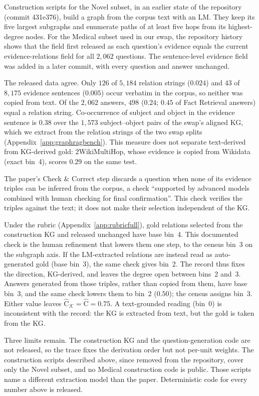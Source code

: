 \documentclass[11pt]{article}
\newcommand{\Chat}{\widehat{\mathrm{C}}}
\newcommand{\kg}{\mathcal{K}}
\begin{document}
Construction scripts for the Novel subset, in an earlier state of the repository (commit 431e376), build a graph from the corpus text with an LM. They keep its five largest subgraphs and enumerate paths of at least five hops from its highest-degree nodes. For the Medical subset used in our swap, the repository history shows that the field first released as each question's evidence equals the current evidence-relations field for all $2{,}062$ questions. The sentence-level evidence field was added in a later commit, with every question and answer unchanged.

The released data agree. Only $126$ of $5{,}184$ relation strings ($0.024$) and $43$ of $8{,}175$ evidence sentences ($0.005$) occur verbatim in the corpus, so neither was copied from text. Of the $2{,}062$ answers, $498$ ($0.24$; $0.45$ of Fact Retrieval answers) equal a relation string. Co-occurrence of subject and object in the evidence sentence is $0.38$ over the $1{,}573$ subject--object pairs of the swap's aligned KG, which we extract from the relation strings of the two swap splits (Appendix~\ref{app:graphragbench}). This measure does not separate text-derived from KG-derived gold: 2WikiMultiHop, whose evidence is copied from Wikidata (exact bin~4), scores $0.29$ on the same test.

The paper's Check \& Correct step discards a question when none of its evidence triples can be inferred from the corpus, a check ``supported by advanced models combined with human checking for final confirmation''. This check verifies the triples against the text; it does not make their selection independent of the KG.

Under the rubric (Appendix~\ref{app:rubricfull}), gold relations selected from the construction KG and released unchanged have base bin~4. This documented check is the human refinement that lowers them one step, to the census bin~3 on the subgraph axis. If the LM-extracted relations are instead read as auto-generated gold (base bin~3), the same check gives bin~2. The record thus fixes the direction, KG-derived, and leaves the degree open between bins~2 and~3. Answers generated from those triples, rather than copied from them, have base bin~3, and the same check lowers them to bin~2 ($0.50$); the census assigns bin~3. Either value leaves $\Chat_{\kg}=\Chat=0.75$. A text-grounded reading (bin~0) is inconsistent with the record: the KG is extracted from text, but the gold is taken from the KG.

Three limits remain. The construction KG and the question-generation code are not released, so the trace fixes the derivation order but not per-unit weights. The construction scripts described above, since removed from the repository, cover only the Novel subset, and no Medical construction code is public. Those scripts name a different extraction model than the paper. Deterministic code for every number above is released.
\end{document}
